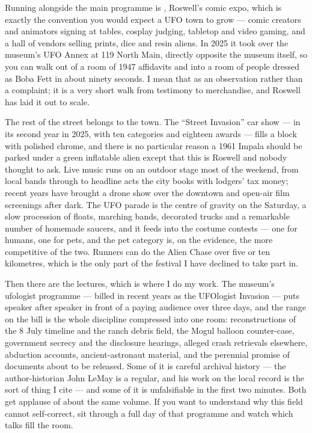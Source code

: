 Running alongside the main programme is , Roswell's comic expo, which is exactly the
convention you would expect a UFO town to grow --- comic creators and animators signing at tables,
cosplay judging, tabletop and video gaming, and a hall of vendors selling prints, dice and resin
aliens. In 2025 it took over the museum's UFO Annex at 119 North Main, directly opposite the museum
itself, so you can walk out of a room of 1947 affidavits and into a room of people dressed as Boba
Fett in about ninety seconds. I mean that as an observation rather than a complaint; it is a very
short walk from testimony to merchandise, and Roswell has laid it out to scale.

The rest of the street belongs to the town. The ``Street Invasion'' car show --- in its second year in
2025, with ten categories and eighteen awards --- fills a block with polished chrome, and there is no
particular reason a 1961 Impala should be parked under a green inflatable alien except that this is
Roswell and nobody thought to ask. Live music runs on an outdoor stage most of the weekend, from local
bands through to headline acts the city books with lodgers' tax money; recent years have brought a
drone show over the downtown and open-air film screenings after dark. The UFO parade is the centre of
gravity on the Saturday, a slow procession of floats, marching bands, decorated trucks and a
remarkable number of homemade saucers, and it feeds into the costume contests --- one for humans, one
for pets, and the pet category is, on the evidence, the more competitive of the two. Runners can do
the Alien Chase over five or ten kilometres, which is the only part of the festival I have declined to
take part in.

Then there are the lectures, which is where I do my work. The museum's ufologist programme --- billed
in recent years as the UFOlogist Invasion --- puts speaker after speaker in front of a paying audience
over three days, and the range on the bill is the whole discipline compressed into one room:
reconstructions of the 8 July timeline and the ranch debris field, the Mogul balloon counter-case,
government secrecy and the disclosure hearings, alleged crash retrievals elsewhere, abduction
accounts, ancient-astronaut material, and the perennial promise of documents about to be released.
Some of it is careful archival history --- the author-historian John LeMay is a regular, and his work
on the local record is the sort of thing I cite --- and some of it is unfalsifiable in the first two
minutes. Both get applause of about the same volume. If you want to understand why this field cannot
self-correct, sit through a full day of that programme and watch which talks fill the room.

